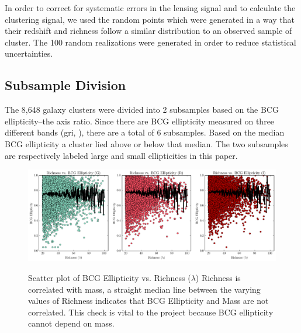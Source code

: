 \documentclass[iop]{emulateapj}
\begin{document}
In order to correct for systematic errors in the lensing signal and to calculate the clustering signal, we used the random points which were generated in a way that their redshift and richness follow a similar distribution to an observed sample of cluster. The 100 random realizations were generated in order to reduce statistical uncertainties.


\subsection{Subsample Division}
The 8,648 galaxy clusters were divided into 2 subsamples based on the BCG ellipticity--the axis ratio. Since there are BCG ellipticity measured on three different bands (gri, \cite{1996AJ....111.1748F}), there are a total of 6 subsamples. Based on the median BCG ellipticity a cluster lied above or below that median. The two subsamples are respectively labeled large and small ellipticities in this paper. 
	\begin{figure}[h]
		\includegraphics[width = \linewidth]{Richness}
		\label{fig:Richness}
		\caption{Scatter plot of BCG Ellipticity vs. Richness ($\lambda$) Richness is correlated with mass, a straight median line between the varying values of Richness indicates that BCG Ellipticity and Mass are not correlated. This check is vital to the project because BCG ellipticity cannot depend on mass.}
	\end{figure}\label{fig:Redshift}
	
\end{document}
